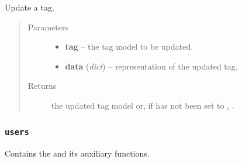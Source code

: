 \documentclass[letterpaper,10pt,english]{sphinxmanual}
\begin{document}

\begin{fulllineitems}
\label{api:onlinelinguisticdatabase.controllers.tags.updateTag}
Update a tag.
\begin{quote}\begin{description}
\item[{Parameters}] \leavevmode\begin{itemize}
\item {} 
\textbf{tag} -- the tag model to be updated.

\item {} 
\textbf{data} (\emph{dict}) -- representation of the updated tag.

\end{itemize}

\item[{Returns}] \leavevmode
the updated tag model or, if  has not been set
to , .

\end{description}\end{quote}

\end{fulllineitems}



\subsubsection{\texttt{users}}
\label{api:module-onlinelinguisticdatabase.controllers.users}\label{api:users}
Contains the {\hyperref[api:onlinelinguisticdatabase.controllers.users.UsersController]{}} and its auxiliary functions.
\label{api:module-users}
\end{document}
